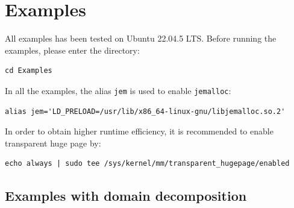 \chapter{Examples}

All examples has been tested on Ubuntu 22.04.5 LTS. Before running the examples, please enter the directory:
\begin{lstlisting}[breaklines=true]
cd Examples
\end{lstlisting}

In all the examples, the alias \lstinline{jem} is used to enable \lstinline{jemalloc}:
\begin{lstlisting}[breaklines=true]
alias jem='LD_PRELOAD=/usr/lib/x86_64-linux-gnu/libjemalloc.so.2'
\end{lstlisting}

In order to obtain higher runtime efficiency, it is recommended to enable transparent huge page by:
\begin{lstlisting}[breaklines=true]
echo always | sudo tee /sys/kernel/mm/transparent_hugepage/enabled
\end{lstlisting}

\section{Examples with domain decomposition}

